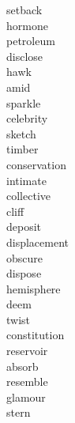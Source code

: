 \documentclass[b5paper, 11pt]{ctexart}
\begin{document}
\begin{multicols*}{3}
\begin{description}
\item[setback]

\item[hormone]

\item[petroleum]

\item[disclose]

\item[hawk]

\item[amid]

\item[sparkle]

\item[celebrity]

\item[sketch]

\item[timber]

\item[conservation]

\item[intimate]

\item[collective]

\item[cliff]

\item[deposit]

\item[displacement]

\item[obscure]

\item[dispose]

\item[hemisphere]

\item[deem]

\item[twist]

\item[constitution]

\item[reservoir]

\item[absorb]

\item[resemble]

\item[glamour]

\item[stern]


\end{description}
\end{multicols*}
\end{document}
